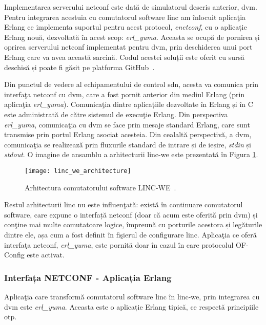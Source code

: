 Implementarea serverului \gls{netconf} este dată de simulatorul descris anterior, \gls{dvm}. Pentru integrarea acestuia cu comutatorul software \gls{linc} am înlocuit aplicaţia Erlang ce implementa suportul pentru acest protocol, \textit{enetconf}, cu o aplicație Erlang nouă, dezvoltată în acest scop: \textit{erl\_yuma}. Aceasta se ocupă de pornirea și oprirea serverului \gls{netconf} implementat pentru \gls{dvm}, prin deschiderea unui port Erlang care va avea această sarcină. Codul acestei soluții este oferit cu sursă deschisă și poate fi găsit pe platforma GitHub~\cite{lincwe2017}.

Din punctul de vedere al echipamentului de control \gls{sdn}, acesta va comunica prin interfaţa \gls{netconf} cu \gls{dvm}, care a fost pornit anterior din mediul Erlang (prin aplicaţia \textit{erl\_yuma}). Comunicaţia dintre aplicațiile dezvoltate în Erlang și în C este administrată de către sistemul de execuţie Erlang. Din perspectiva \textit{erl\_yuma}, comunicaţia cu \gls{dvm} se face prin mesaje standard Erlang, care sunt transmise prin portul Erlang asociat acesteia. Din cealaltă perspectivă, a \gls{dvm}, comunicaţia se realizează prin fluxurile standard de intrare și de ieșire, \textit{stdin} și \textit{stdout}. O imagine de ansamblu a arhitecturii \gls{linc-we} este prezentată în Figura \ref{fig:linc_we_architecture}.

\begin{figure}[h]
	\centering
	\texttt{[image: linc\_we\_architecture]}
	\caption{Arhitectura comutatorului software LINC-WE~\cite{linc2014qsg}.}
	\label{fig:linc_we_architecture}
\end{figure}

Restul arhitecturii \gls{linc} nu este influenţată: există în continuare comutatorul software, care expune o interfață \gls{netconf} (doar că acum este oferită prin \gls{dvm}) și conţine mai multe comutatoare logice, împreună cu porturile acestora și legăturile dintre ele, așa cum a fost definit în fişierul de configurare \gls{linc}. Aplicaţia ce oferă interfaţa \gls{netconf}, \textit{erl\_yuma}, este pornită doar în cazul în care protocolul OF-Config este activat.

\subsubsection{Interfața NETCONF - Aplicația Erlang}

Aplicaţia care transformă comutatorul software \gls{linc} în \gls{linc-we}, prin integrarea cu \gls{dvm} este \textit{erl\_yuma}. Aceasta este o aplicație Erlang tipică, ce respectă principiile \gls{otp}.

